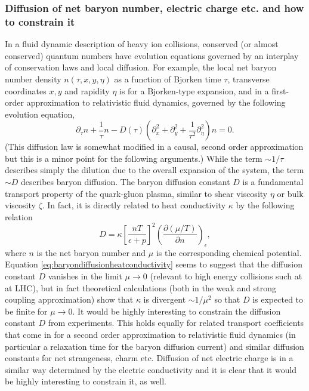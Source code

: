 \subsubsection{Diffusion of net baryon number, electric charge etc. and how to constrain it}
In a fluid dynamic description of heavy ion collisions, conserved (or almost conserved) quantum numbers have evolution equations governed by an interplay of conservation laws and local diffusion. For example, the local net baryon number density $n(\tau, x, y, \eta)$ as a function of Bjorken time $\tau$, transverse coordinates $x,y$ and rapidity $\eta$ is for a Bjorken-type expansion, and in a first-order approximation to relativistic fluid dynamics, governed by the following evolution equation,
\begin{equation}
\partial_\tau n + \frac{1}{\tau}n - D(\tau) \left( \partial_x^2 + \partial_y^2 + \frac{1}{\tau^2} \partial_\eta^2 \right) n =0.
\end{equation}
(This diffusion law is somewhat modified in a causal, second order approximation but this is a minor point for the following arguments.) While the term $\sim 1/ \tau$ describes simply the dilution due to the overall expansion of the system, the term $\sim D$ describes baryon diffusion. The baryon diffusion constant $D$ is a fundamental transport property of the quark-gluon plasma, similar to shear viscosity $\eta$ or bulk viscosity $\zeta$. In fact, it is directly related to heat conductivity $\kappa$ by the following relation
\begin{equation}
D = \kappa \left[ \frac{nT}{\epsilon + p} \right]^2 \left( \frac{\partial (\mu/T)}{\partial n} \right)_\epsilon,
\label{eq:baryondiffusionheatconductivity}
\end{equation}
where $n$ is the net baryon number and $\mu$ is the corresponding chemical potential. Equation \eqref{eq:baryondiffusionheatconductivity} seems to suggest that the diffusion constant $D$ vanishes in the limit $\mu\to 0$ (relevant to high energy collisions such at at LHC), but in fact theoretical calculations (both in the weak and strong coupling approximation) show that $\kappa$ is divergent $\sim 1/\mu^2$ so that $D$ is expected to be finite for $\mu\to 0$. It would be highly interesting to constrain the diffusion constant $D$ from experiments. This holds equally for related transport coefficients that come in for a second order approximation to relativistic fluid dynamics (in particular a relaxation time for the baryon diffusion current) and similar diffusion constants for net strangeness, charm etc. Diffusion of net electric charge is in a similar way determined by the electric conductivity and it is clear that it would be highly interesting to constrain it, as well.
